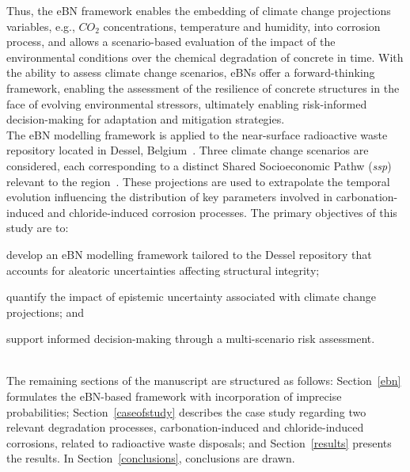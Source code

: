 Thus, the eBN framework enables the embedding of climate change projections variables, e.g., $CO_2$ concentrations, temperature and humidity, into corrosion process, and allows a scenario-based evaluation of the impact of the environmental conditions over the chemical degradation of concrete in time.
With the ability to assess climate change scenarios, eBNs offer a forward-thinking framework, enabling the assessment of the resilience of concrete structures in the face of evolving environmental stressors, ultimately enabling risk-informed decision-making for adaptation and mitigation strategies.\\

The eBN modelling framework is applied to the near-surface radioactive waste repository located in Dessel, Belgium~\cite{tosoni_comprehensiveness_2019-1}.
Three climate change scenarios are considered, each corresponding to a distinct Shared Socioeconomic Pathw (\textit{ssp}) relevant to the region~\cite{CMIP6}.
These projections are used to extrapolate the temporal evolution influencing the distribution of key parameters involved in carbonation-induced and chloride-induced corrosion processes.
The primary objectives of this study are to: 
\begin{enumerate*}[label=\roman*)]
    \item  develop an eBN modelling framework tailored to the Dessel repository that accounts for aleatoric uncertainties affecting structural integrity;
    \item quantify the impact of epistemic uncertainty associated with climate change projections; and
    \item support informed decision-making through a multi-scenario risk assessment.
\end{enumerate*}
\\

The remaining sections of the manuscript are structured as follows: Section~\ref{ebn} formulates the eBN-based framework with incorporation of imprecise probabilities; Section~\ref{caseofstudy} describes the case study regarding two relevant degradation processes, carbonation-induced and chloride-induced corrosions, related to radioactive waste disposals; and Section~\ref{results} presents the results. In Section~\ref{conclusions}, conclusions are drawn.


